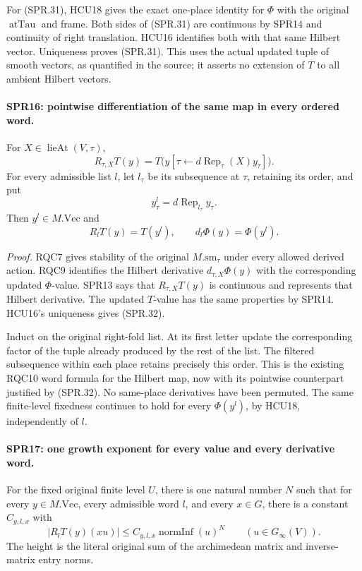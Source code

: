 For (SPR.31), HCU18 gives the exact one-place identity for
\(\Phi\) with the original \(\operatorname{atTau}\) and frame.
Both sides of (SPR.31) are continuous by SPR14 and continuity
of right translation.  HCU16 identifies both with that same
Hilbert vector.  Uniqueness proves (SPR.31).
This uses the actual updated tuple of smooth vectors, as
quantified in the source; it asserts no extension of \(T\) to
all ambient Hilbert vectors.

\paragraph{SPR16: pointwise differentiation of the same map in every ordered word.}
\label{claim:SPR16}
For \(X\in\operatorname{lieAt}(V,\tau)\),
\[
 R_{\tau,X}T(y)
   =T\bigl(y[\tau\leftarrow d\operatorname{Rep}_\tau(X)y_\tau]\bigr).
 \tag{SPR.32}
\]
For every admissible list \(l\), let \(l_\tau\) be its subsequence
at \(\tau\), retaining its order, and put
\[
        y^l_\tau=d\operatorname{Rep}_{l_\tau}y_\tau.
\]
Then \(y^l\in M.\mathrm{Vec}\) and
\[
                 R_lT(y)=T(y^l),\qquad
                   d_l\Phi(y)=\Phi(y^l).
 \tag{SPR.33}
\]

\emph{Proof.}
RQC7 gives stability of the original \(M.\mathrm{sm}_\tau\)
under every allowed derived action.
RQC9 identifies the Hilbert derivative
\(d_{\tau,X}\Phi(y)\) with the corresponding updated \(\Phi\)-value.
SPR13 says that \(R_{\tau,X}T(y)\) is continuous and represents
that Hilbert derivative.
The updated \(T\)-value has the same properties by SPR14.
HCU16's uniqueness gives (SPR.32).

Induct on the original right-fold list.
At its first letter update the corresponding factor of the tuple
already produced by the rest of the list.
The filtered subsequence within each place retains precisely this
order.  This is the existing RQC10 word formula for the Hilbert
map, now with its pointwise counterpart justified by (SPR.32).
No same-place derivatives have been permuted.
The same finite-level fixedness continues to hold for every
\(\Phi(y^l)\), by HCU18, independently of \(l\).

\paragraph{SPR17: one growth exponent for every value and every derivative word.}
\label{claim:SPR17}
For the fixed original finite level \(U\), there is one natural
number \(N\) such that for every \(y\in M.\mathrm{Vec}\), every
admissible word \(l\), and every \(x\in G\), there is a constant
\(C_{y,l,x}\) with
\[
              |R_lT(y)(xu)|
                 \le C_{y,l,x}\operatorname{normInf}(u)^N
                       \qquad(u\in G_\infty(V)).
 \tag{SPR.34}
\]
The height is the literal original sum of the archimedean matrix
and inverse-matrix entry norms.

